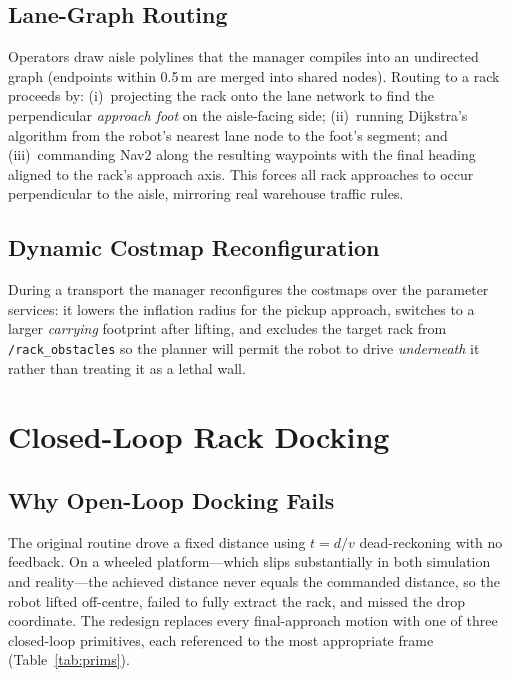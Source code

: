 \documentclass[11pt,a4paper]{article}
\newcommand{\code}[1]{\texttt{\small #1}}
\begin{document}
\subsection{Lane-Graph Routing}
Operators draw aisle polylines that the manager compiles into an undirected
graph (endpoints within 0.5\,m are merged into shared nodes). Routing to a
rack proceeds by: (i)~projecting the rack onto the lane network to find the
perpendicular \emph{approach foot} on the aisle-facing side; (ii)~running
Dijkstra's algorithm from the robot's nearest lane node to the foot's
segment; and (iii)~commanding Nav2 along the resulting waypoints with the
final heading aligned to the rack's approach axis. This forces all rack
approaches to occur perpendicular to the aisle, mirroring real warehouse
traffic rules.

\subsection{Dynamic Costmap Reconfiguration}
During a transport the manager reconfigures the costmaps over the parameter
services: it lowers the inflation radius for the pickup approach, switches to
a larger \emph{carrying} footprint after lifting, and excludes the target
rack from \code{/rack\_obstacles} so the planner will permit the robot to
drive \emph{underneath} it rather than treating it as a lethal wall.

\section{Closed-Loop Rack Docking}\label{sec:dock}
\subsection{Why Open-Loop Docking Fails}
The original routine drove a fixed distance using
$t = d / v$ dead-reckoning with no feedback. On a wheeled platform---which
slips substantially in both simulation and reality---the achieved distance
never equals the commanded distance, so the robot lifted off-centre, failed
to fully extract the rack, and missed the drop coordinate. The redesign
replaces every final-approach motion with one of three closed-loop
primitives, each referenced to the most appropriate frame
(Table~\ref{tab:prims}).
\end{document}
